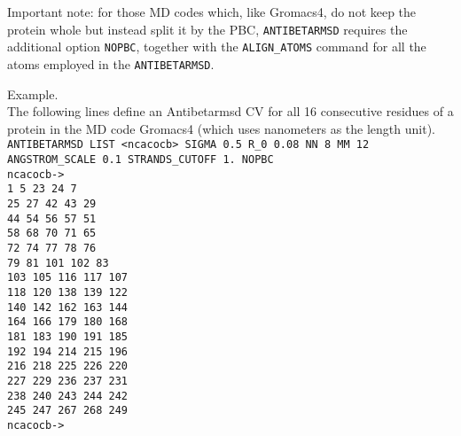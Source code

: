 \documentclass[12pt,fleqn]{report}
\newcommand{\esempio}[1]{
\vspace{10pt}
\begin{flushright}
\colorbox{light-gray}{
   \begin{minipage}{13cm}
       \scriptsize{
{\fontfamily{phv} \fontseries{b}
 \selectfont Example. \\
 \fontseries{m} \selectfont #1 } }
\end{minipage}}
\end{flushright}
\vspace{20pt}
}
\begin{document}
Important note: for those MD codes which, like Gromacs4, do not keep the protein whole but instead split it by the PBC,
 {\tt ANTIBETARMSD} requires the additional option {\tt NOPBC}, together
with the {\tt ALIGN\_ATOMS} command for all the atoms employed in the {\tt ANTIBETARMSD}.


\esempio{The following lines define an Antibetarmsd CV for all 16 consecutive residues of a protein in the MD code Gromacs4
(which uses nanometers as the length unit).
 \vspace{10pt} \\
{\tt ANTIBETARMSD LIST <ncacocb> SIGMA 0.5 R\_0 0.08 NN 8 MM 12 ANGSTROM\_SCALE 0.1 STRANDS\_CUTOFF 1. NOPBC \\
ncacocb-> \\
    1     5    23    24     7\\
   25    27    42    43    29\\
   44    54    56    57    51\\
   58    68    70    71    65\\
   72    74    77    78    76\\
   79    81   101   102    83\\
  103   105   116   117   107\\
  118   120   138   139   122\\
  140   142   162   163   144\\
  164   166   179   180   168\\
  181   183   190   191   185\\
  192   194   214   215   196\\
  216   218   225   226   220\\
  227   229   236   237   231\\
  238   240   243   244   242\\
  245   247   267   268   249\\
ncacocb-> }}

\end{document}
